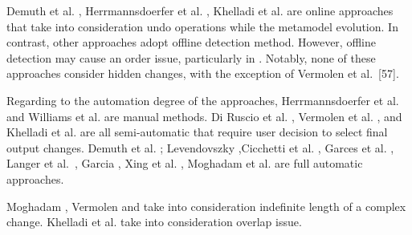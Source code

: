  	  
 
 				

 	
 	



Demuth et al. \cite{demuth2015constraint}, Herrmannsdoerfer et al. \cite{herrmannsdoerfer2009cope}, Khelladi et al. \cite{khelladi2016detecting} are online approaches that take into consideration undo operations while the metamodel evolution.
In contrast, other approaches \cite{williams2012searching,10.1145/2000410.2000416,levendovszky2014semi,garces2009managing,cicchetti_managing_2009,langer_posteriori_2013,garcia2012model,xing2006refactoring,moghadam2012automated,vermolen_reconstructing_2012} adopt offline detection method. However,  offline detection may cause an order issue, particularly in \cite{williams2012searching,10.1145/2000410.2000416,levendovszky2014semi,garces2009managing,langer_posteriori_2013,garcia2012model,xing2006refactoring,moghadam2012automated}. Notably, none of these approaches consider hidden changes, with the exception of Vermolen et al.~[57].


Regarding to the automation degree of the approaches, Herrmannsdoerfer et al. \cite{herrmannsdoerfer2009cope} and
Williams et al. \cite{williams2012searching} are manual methods. Di Ruscio et al. \cite{10.1145/2000410.2000416}, Vermolen et al. \cite{vermolen_reconstructing_2012}, and Khelladi et al. \cite{khelladi2016detecting} are all semi-automatic that require user decision to select final output changes.
Demuth et al. \cite{demuth2015constraint}; Levendovszky \cite{levendovszky2014semi},Cicchetti et al. \cite{cicchetti_managing_2009}, Garces et al. \cite{garces2009managing}, Langer et al.~\cite{langer_posteriori_2013}, Garcia \cite{garcia2012model}, Xing  et al. \cite{xing2006refactoring}, Moghadam et al. \cite{moghadam2012automated} are full automatic approaches.




Moghadam \cite{moghadam2012automated}, Vermolen \cite{vermolen_reconstructing_2012} and \cite{khelladi2016detecting} take into consideration indefinite length of a complex change.
Khelladi et al. \cite{khelladi2016detecting} take into consideration overlap issue.


